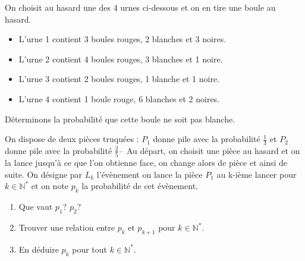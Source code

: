 \documentclass[a4paper,10pt]{report}
\begin{document}
\begin{itemize}
\begin{Exemple} 
On choisit au hasard une des 4 urnes ci-dessous et on en tire une boule au hasard.
\begin{itemize}
 \item L'urne 1 contient 3 boules rouges, 2 blanches et 3 noires.
 \item L'urne 2 contient 4 boules rouges, 3 blanches et 1 noire.
 \item L'urne 3 contient 2 boules rouges, 1 blanche et 1 noire.
 \item L'urne 4 contient 1 boule rouge, 6 blanches et 2 noires.
\end{itemize}
Déterminons la probabilité que cette boule ne soit pas blanche.

\vspace{7cm}
\end{Exemple}

\begin{ApplicationDirecte} On dispose de deux pièces truquées : $P_1$ donne pile avec la probabilité $\frac{1}{3}$ et $P_2$ donne pile avec la probabilité $\frac{2}{5} \cdot$ Au départ, on choisit une pièce au hasard et on la lance jusqu'à ce que l'on obtienne face, on change alors de pièce et ainsi de suite. On désigne par $L_k$ l'évènement \og on lance la pièce $P_1$ au k-ième lancer \fg pour $k \in \mathbb{N}^*$ et on note $p_k$ la probabilité de cet évènement.
\begin{enumerate}
\item Que vaut $p_1$? $p_2$?
\item Trouver une relation entre $p_k$ et $p_{k+1}$ pour $k \in \mathbb{N}^*$.
\item En déduire $p_k$ pour tout $k \in \mathbb{N}^*$.
\end{enumerate}
\end{ApplicationDirecte}


\end{itemize}
\end{document}
